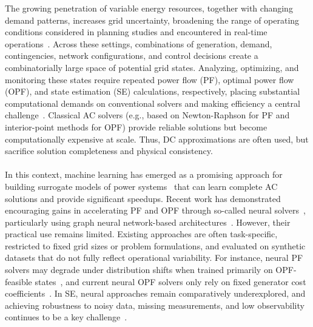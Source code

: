 The growing penetration of variable energy resources, together with changing demand patterns, increases grid uncertainty, broadening the range of operating conditions considered in planning studies and encountered in real-time operations~\cite{doe2024national}. Across these settings, combinations of generation, demand, contingencies, network configurations, and control decisions create a combinatorially large space of potential grid states. Analyzing, optimizing, and monitoring these states require repeated power flow (PF), optimal power flow (OPF), and state estimation (SE) calculations, respectively, placing substantial computational demands on conventional solvers and making efficiency a central challenge~\cite{whitehouse2022climategoals,doe2022cleanelectricity}. Classical AC solvers (e.g., based on Newton-Raphson for PF and interior-point methods for OPF) provide reliable solutions but become computationally expensive at scale. Thus, DC approximations are often used, but sacrifice solution completeness and physical consistency.
\\\\
In this context, machine learning has emerged as a promising approach for building surrogate models of power systems~\cite{benes2024ai,daniel2024ai,smartcities4020029,cremer2024pioneeringroadmapmldrivenalgorithmic,11371605} that can learn complete AC solutions and provide significant speedups. Recent work has demonstrated encouraging gains in accelerating PF and OPF through so-called neural solvers~\cite{DONON2020106547,gnnreviewpowergrid,Khaloie}, particularly using graph neural network-based architectures~\cite{gnnreview,Wu_2021}. However, their practical use remains limited. Existing approaches are often task-specific, restricted to fixed grid sizes or problem formulations, and evaluated on synthetic datasets that do not fully reflect operational variability. For instance, neural PF solvers may degrade under distribution shifts when trained primarily on OPF-feasible states~\cite{lin2024powerflownet,DONON2020106547, NEURIPS2025_d000ef56}, and current neural OPF solvers only rely on fixed generator cost coefficients~\cite{lovett2024opfdatalargescaledatasetsac,opflearn,pglearn,varbella2024powergraph}. In SE, neural approaches remain comparatively underexplored, and achieving robustness to noisy data, missing measurements, and low observability continues to be a key challenge~\cite{10408467,BHUSAL2021106806}.\\


